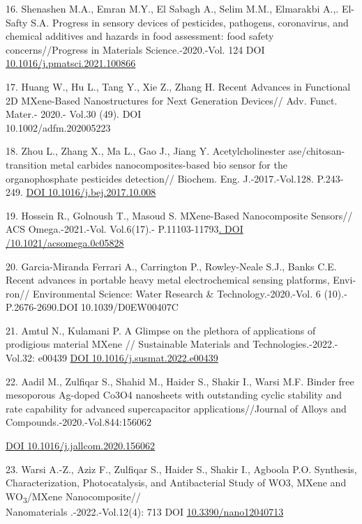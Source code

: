 \begin{references}
16. Shenashen M.A., Emran M.Y., El Sabagh A., Selim M.M.,
Elmarakbi A.,. El- Safty S.A. Progress in sensory devices of
pesticides, pathogens, coronavirus, and chemical additives and
hazards in food assessment: food safety concerns//Progress in
Materials Science.-2020.-Vol. 124 DOI\\
\href{http://dx.doi.org/10.1016/j.pmatsci.2021.100866}{10.1016/j.pmatsci.2021.100866}

17. Huang W., Hu L., Tang Y., Xie Z., Zhang H. Recent Advances in
Functional 2D MXene-Based Nanostructures for Next Generation
Devices// Adv. Funct. Mater.- 2020.- Vol.30 (49).
DOI \\10.1002/adfm.202005223

18. Zhou L., Zhang X., Ma L., Gao J., Jiang Y. Acetylcholinester
ase/chitosan-transition metal carbides nanocomposites-based bio
sensor for the organophosphate pesticides detection// Biochem.
Eng. J.-2017.-Vol.128. P.243-249.
\href{https://doi.org/10.1016/j.bej.2017.10.008}{DOI
10.1016/j.bej.2017.10.008}

19. Hossein R., Golnoush T., Masoud S. MXene-Based Nanocomposite
Sensors// ACS Omega.-2021.-Vol. Vol.6(17).-
P.11103-11793\href{https://pubs.acs.org/doi/10.1021/acsomega.0c05828}{.
DOI /10.1021/acsomega.0c05828}

20. Garcia-Miranda Ferrari A., Carrington P., Rowley-Neale S.J.,
Banks C.E. Recent advances in portable heavy metal
electrochemical sensing platforms, Envi- ron// Environmental
Science: Water Research \& Technology.-2020.-Vol. 6 (10).-
P.2676-2690.DOI 10.1039/D0EW00407C

21. Amtul N., Kulamani P. A Glimpse on the plethora of
applications of prodigious material MXene // Sustainable Materials
and Technologies.-2022.-Vol.32: e00439
\href{https://doi.org/10.1016/j.susmat.2022.e00439}{DOI
10.1016/j.susmat.2022.e00439}

22. Aadil M., Zulfiqar S., Shahid M., Haider S., Shakir I.,
Warsi M.F. Binder free mesoporous Ag-doped Co3O4 nanosheets with
outstanding cyclic stability and rate capability for advanced
supercapacitor applications//Journal of Alloys and
Compounds.-2020.-Vol.844:156062

\href{https://doi.org/10.1016/j.jallcom.2020.156062}{DOI
10.1016/j.jallcom.2020.156062}

23. Warsi A.-Z., Aziz F., Zulfiqar S., Haider S., Shakir I.,
Agboola P.O. Synthesis, Characterization, Photocatalysis, and
Antibacterial Study of WO3, MXene and WO\textsubscript{3}/MXene
Nanocomposite//\\ Nanomaterials .-2022.-Vol.12(4): 713 DOI
\href{http://dx.doi.org/10.3390/nano12040713}{10.3390/nano12040713}


\end{references}
